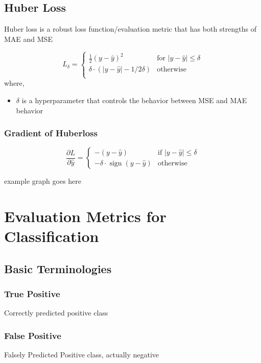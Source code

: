 \documentclass[12pt]{extarticle}
\begin{document}
\subsection{Huber Loss}
Huber loss is a robust loss function/evaluation metric that has both strengths of MAE and MSE


$$
L_\delta = 
\begin{cases} 
    \frac{1}{2}(y-\hat{y})^2 & \text{for }|y-\hat{y}| \le \delta \\
    \delta \cdot (|y-\hat{y}|-1/2 \delta) & \text{otherwise} \\
\end{cases}
$$
where, 
\begin{itemize}
    \item \( \delta \) is a hyperparameter that controls the behavior between 
        MSE and MAE behavior
\end{itemize}

\subsubsection{Gradient of Huberloss}

\[
\frac{\partial L}{\partial \hat{y}} =
\begin{cases}
-(y - \hat{y}) & \text{if } |y - \hat{y}| \leq \delta \\
-\delta \cdot \operatorname{sign}(y - \hat{y}) & \text{otherwise}
\end{cases}
\]

example graph goes here

\section{Evaluation Metrics for Classification}

\subsection{Basic Terminologies}

\subsubsection{True Positive}
Correctly predicted positive class

\subsubsection{False Positive}
Falsely Predicted Positive class, actually negative
\end{document}
